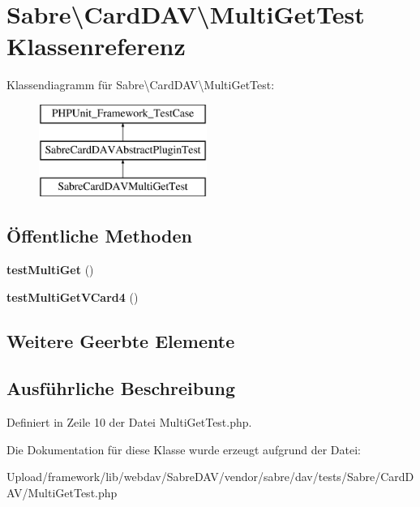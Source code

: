 \hypertarget{class_sabre_1_1_card_d_a_v_1_1_multi_get_test}{}\section{Sabre\textbackslash{}Card\+D\+AV\textbackslash{}Multi\+Get\+Test Klassenreferenz}
\label{class_sabre_1_1_card_d_a_v_1_1_multi_get_test}
Klassendiagramm für Sabre\textbackslash{}Card\+D\+AV\textbackslash{}Multi\+Get\+Test\+:\begin{figure}[H]
\begin{center}
\leavevmode
\includegraphics[height=3.000000cm]{class_sabre_1_1_card_d_a_v_1_1_multi_get_test}
\end{center}
\end{figure}
\subsection*{Öffentliche Methoden}
\begin{DoxyCompactItemize}
\item 
\mbox{\label{class_sabre_1_1_card_d_a_v_1_1_multi_get_test_a9a313dc34408fe7b98f91d275ce96ac1}} 
{\bfseries test\+Multi\+Get} ()
\item 
\mbox{\label{class_sabre_1_1_card_d_a_v_1_1_multi_get_test_a544b8b5769ff8a0c7789a98f534dfd05}} 
{\bfseries test\+Multi\+Get\+V\+Card4} ()
\end{DoxyCompactItemize}
\subsection*{Weitere Geerbte Elemente}


\subsection{Ausführliche Beschreibung}


Definiert in Zeile 10 der Datei Multi\+Get\+Test.\+php.



Die Dokumentation für diese Klasse wurde erzeugt aufgrund der Datei\+:\begin{DoxyCompactItemize}
\item 
Upload/framework/lib/webdav/\+Sabre\+D\+A\+V/vendor/sabre/dav/tests/\+Sabre/\+Card\+D\+A\+V/Multi\+Get\+Test.\+php\end{DoxyCompactItemize}
